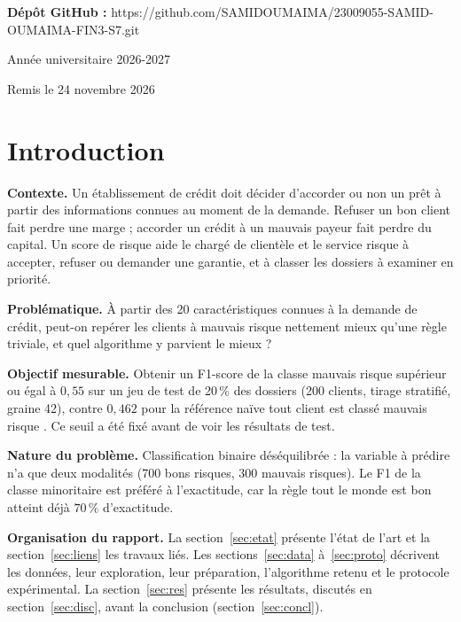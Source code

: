 \documentclass[12pt,a4paper]{article}
\begin{document}
\begin{titlepage}
\vspace{0.8cm}
\centering
\textbf{Dépôt GitHub :} {https://github.com/SAMIDOUMAIMA/23009055-SAMID-OUMAIMA-FIN3-S7.git}

\vfill
Année universitaire 2026-2027\par
{\small Remis le 24 novembre 2026\par}
\vspace{0.5cm}
\end{titlepage}

\section{Introduction}
\textbf{Contexte.} Un établissement de crédit doit décider d’accorder ou non un prêt à partir des informations connues au moment de la demande. Refuser un bon client fait perdre une marge ; accorder un crédit à un mauvais payeur fait perdre du capital. Un score de risque aide le chargé de clientèle et le service risque à accepter, refuser ou demander une garantie, et à classer les dossiers à examiner en priorité.

\textbf{Problématique.} À partir des 20 caractéristiques connues à la demande de crédit, peut-on repérer les clients à \og mauvais risque \fg{} nettement mieux qu’une règle triviale, et quel algorithme y parvient le mieux ?

\textbf{Objectif mesurable.} Obtenir un F1-score de la classe \og mauvais risque \fg{} supérieur ou égal à $0{,}55$ sur un jeu de test de 20\,\% des dossiers (200 clients, tirage stratifié, graine 42), contre $0{,}462$ pour la référence naïve \og tout client est classé mauvais risque \fg{}. Ce seuil a été fixé avant de voir les résultats de test.

\textbf{Nature du problème.} Classification binaire déséquilibrée : la variable à prédire n’a que deux modalités (700 bons risques, 300 mauvais risques). Le F1 de la classe minoritaire est préféré à l’exactitude, car la règle \og tout le monde est bon \fg{} atteint déjà $70\,\%$ d’exactitude.

\textbf{Organisation du rapport.} La section~\ref{sec:etat} présente l’état de l’art et la section~\ref{sec:liens} les travaux liés. Les sections~\ref{sec:data} à~\ref{sec:proto} décrivent les données, leur exploration, leur préparation, l’algorithme retenu et le protocole expérimental. La section~\ref{sec:res} présente les résultats, discutés en section~\ref{sec:disc}, avant la conclusion (section~\ref{sec:concl}).
\end{document}
